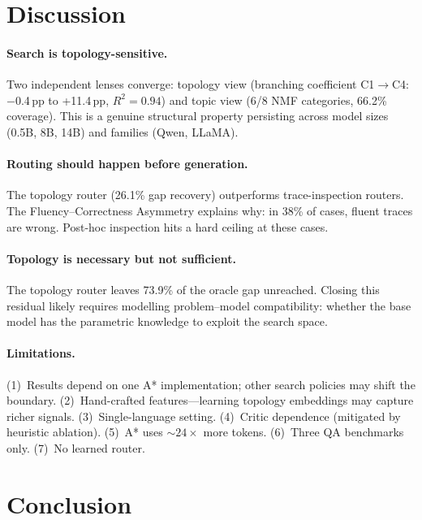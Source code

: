 \documentclass[11pt]{article}
\newcommand{\pp}{\,pp\xspace}
\begin{document}
\section{Discussion}
\label{sec:discussion}

\paragraph{Search is topology-sensitive.}
Two independent lenses converge: topology view (branching coefficient
C1$\rightarrow$C4: $-$0.4\pp to +11.4\pp, $R^2{=}0.94$) and topic view
(6/8 NMF categories, 66.2\% coverage).  This is a genuine structural property
persisting across model sizes (0.5B, 8B, 14B) and families (Qwen, LLaMA).

\paragraph{Routing should happen before generation.}
The topology router (26.1\% gap recovery) outperforms trace-inspection routers.
The Fluency--Correctness Asymmetry explains why: in 38\% of cases, fluent
traces are wrong.  Post-hoc inspection hits a hard ceiling at these cases.

\paragraph{Topology is necessary but not sufficient.}
The topology router leaves 73.9\% of the oracle gap unreached.  Closing this
residual likely requires modelling problem--model compatibility: whether the
base model has the parametric knowledge to exploit the search space.

\paragraph{Limitations.}
(1)~Results depend on one A* implementation; other search policies may shift
the boundary.  (2)~Hand-crafted features---learning topology embeddings may
capture richer signals.  (3)~Single-language setting.  (4)~Critic dependence
(mitigated by heuristic ablation).  (5)~A* uses ${\sim}24\times$ more tokens.
(6)~Three QA benchmarks only.  (7)~No learned router.

\section{Conclusion}
\label{sec:conclusion}
\end{document}
